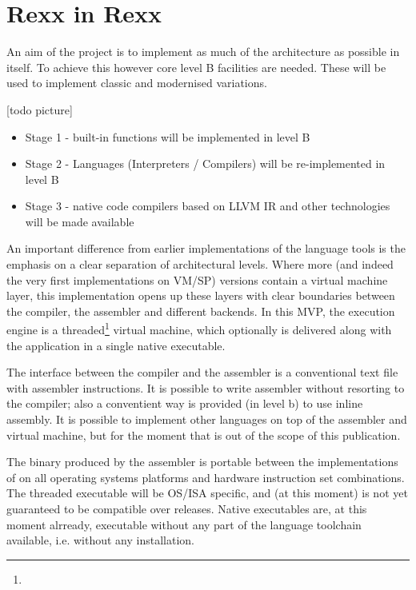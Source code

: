 \section{Rexx in Rexx}
An aim of the project is to implement as much of the \crexx{} architecture as possible in \rexx{} itself. To achieve this however core \rexx{} level B facilities are needed. These will be used to implement classic \rexx{} and modernised \rexx{} variations. 

[todo picture]
\begin{itemize}
\item Stage 1 - \rexx{} built-in functions will be implemented in \crexx{} level B
\item Stage 2 - \rexx{} Languages (Interpreters / Compilers) will be re-implemented in \crexx{} level B
\item Stage 3 - native code compilers based on LLVM IR and other technologies will be made available
\end{itemize}

An important difference from earlier implementations of the language tools is the emphasis on a clear separation of architectural levels. Where more (and indeed the very first implementations on VM/SP) versions contain a virtual machine layer, this implementation opens up these layers with clear boundaries between the compiler, the assembler and different backends. In this MVP, the execution engine is a threaded\footnote{} virtual machine, which optionally is delivered along with the application in a single native executable.

The interface between the compiler and the assembler is a conventional text file with \crexx{} assembler instructions. It is possible to write \crexx{} assembler without resorting to the compiler; also a conventient way is provided (in \crexx{} level b) to use inline assembly. It is possible to implement other languages on top of the assembler and virtual machine, but for the moment that is out of the scope of this publication.

The binary produced by the assembler is portable between the implementations of \crexx{} on all operating systems platforms and hardware instruction set combinations. The threaded executable will be OS/ISA specific, and (at this moment) is not yet guaranteed to be compatible over \crexx{} releases. Native executables are, at this moment alrready, executable without any part of the language toolchain available, i.e. without any installation.


